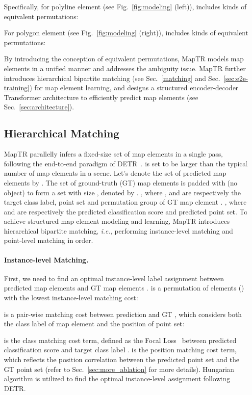 \documentclass{article} \usepackage{iclr2023_conference,times}
\def\ie{\emph{i.e.}} \def\Ie{\emph{I.e.}}
\begin{document}
Specifically, for polyline element (see Fig.~\ref{fig:modeling} (left)),   includes  kinds of equivalent permutations:


For polygon element (see Fig.~\ref{fig:modeling} (right)),   includes  kinds of equivalent permutations:





By introducing the conception of equivalent permutations, MapTR models map elements in a unified manner and addresses the ambiguity issue. 
MapTR further introduces hierarchical bipartite matching (see Sec.~\ref{matching} and Sec.~\ref{sec:e2e-training}) for map element learning, and designs a structured encoder-decoder Transformer architecture to efficiently predict map elements (see  Sec.~\ref{sec:architecture}). 

\subsection{Hierarchical Matching\label{matching}}
MapTR parallelly infers a fixed-size set of  map elements in a single pass, following the end-to-end paradigm of DETR~\citep{detr,yolos}.  is set to be larger than the typical number of map elements in a scene. Let's denote the set of  predicted map elements by . 
The set of ground-truth (GT) map elements is padded with  (no object) to form a set with size , denoted by .
, where ,  and  are respectively the target class label, point set and permutation group of GT map element . , where  and  are respectively the predicted classification score and predicted point set.
To achieve structured map element modeling and learning,
MapTR introduces hierarchical bipartite matching, \ie,  performing instance-level matching and point-level matching in order.


\paragraph{Instance-level Matching.\label{sec:ins-lvl-matching}}

First, we need to find an optimal instance-level label assignment  between predicted map elements  and GT map elements .   is a permutation of  elements () with the lowest instance-level matching cost:


 is a pair-wise matching cost between prediction  and GT , which  considers both the class label of map element and the position of point set:

 is the class matching cost term, defined as the Focal Loss~\citep{focal} between predicted classification score  and target class label .
 is the position matching cost term, which reflects the position correlation between the predicted point set  and the GT point set  (refer to Sec.~\ref{sec:more_ablation} for more details). 
Hungarian algorithm is utilized to find the optimal instance-level assignment  following DETR.
\end{document}
